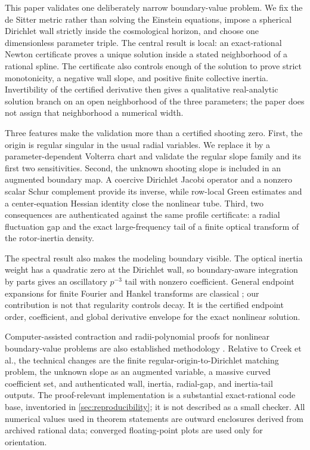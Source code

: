 This paper validates one deliberately narrow boundary-value problem.  We fix
the de Sitter metric rather than solving the Einstein equations, impose a
spherical Dirichlet wall strictly inside the cosmological horizon, and choose
one dimensionless parameter triple.  The central result is local: an
exact-rational Newton certificate proves a unique solution inside a stated
neighborhood of a rational spline.  The certificate also controls enough of
the solution to prove strict monotonicity, a negative wall slope, and positive
finite collective inertia.  Invertibility of the certified derivative then
gives a qualitative real-analytic solution branch on an open neighborhood of
the three parameters; the paper does not assign that neighborhood a numerical
width.

Three features make the validation more than a certified shooting zero.
First, the origin is regular singular in the usual radial variables.  We
replace it by a parameter-dependent Volterra chart and validate the regular
slope family and its first two sensitivities.  Second, the unknown shooting
slope is included in an augmented boundary map.  A coercive Dirichlet Jacobi
operator and a nonzero scalar Schur complement provide its inverse, while
row-local Green estimates and a center-equation Hessian identity close the
nonlinear tube.  Third, two consequences are authenticated against the same
profile certificate: a radial fluctuation gap and the exact large-frequency
tail of a finite optical transform of the rotor-inertia density.

The spectral result also makes the modeling boundary visible.  The optical
inertia weight has a quadratic zero at the Dirichlet wall, so boundary-aware
integration by parts gives an oscillatory $p^{-3}$ tail with nonzero
coefficient.  General endpoint expansions for finite Fourier and Hankel
transforms are classical \cite{wang2018,okadayamane2024}; our contribution is
not that regularity controls decay.  It is the certified endpoint order,
coefficient, and global derivative envelope for the exact nonlinear solution.

Computer-assisted contraction and radii-polynomial proofs for nonlinear
boundary-value problems are also established methodology
\cite{vandenberg2018,liu2021}.  Relative to Creek et al., the technical changes
are the finite regular-origin-to-Dirichlet matching problem, the unknown slope
as an augmented variable, a massive curved coefficient set, and authenticated
wall, inertia, radial-gap, and inertia-tail outputs.  The proof-relevant
implementation is a substantial exact-rational code base, inventoried in
\cref{sec:reproducibility}; it is not described as a small checker.  All
numerical values used in theorem statements are outward enclosures derived from
archived rational data; converged floating-point plots are used only for
orientation.

